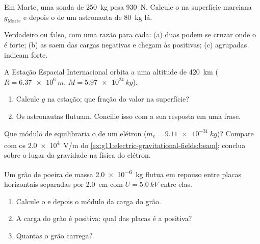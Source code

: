 \begin{exercise}[$\star$]\label{exo:g11:electric-gravitational-fields:4}
Em Marte, uma sonda de \qty{250}{kg} pesa \qty{930}{N}. Calcule o 
na superfície marciana $g_{\text{Marte}}$ e depois o  de um
astronauta de \qty{80}{kg} lá.
\end{exercise}

\begin{exercise}[$\star$]\label{exo:g11:electric-gravitational-fields:5}
Verdadeiro ou falso, com uma razão para cada: (a) duas 
podem se cruzar onde o  é forte; (b) as  saem das
cargas negativas e chegam às positivas; (c)  agrupadas
indicam  forte.
\end{exercise}

\begin{exercise}[$\star\star$]\label{exo:g11:electric-gravitational-fields:6}
A Estação Espacial Internacional orbita a uma altitude de \qty{420}{km}
($R = \qty{6.37e6}{m}$, $M = \qty{5.97e24}{kg}$).
\begin{enumerate}
  \item Calcule $g$ na estação; que fração do valor na superfície?
  \item Os astronautas flutuam. Concilie isso com a sua resposta em uma
        frase.
\end{enumerate}
\end{exercise}

\begin{exercise}[$\star\star$]\label{exo:g11:electric-gravitational-fields:7}
Que módulo de  equilibraria o  de um elétron
($m_e = \qty{9.11e-31}{kg}$)? Compare com os \qty{2.0e4}{V/m} do
\cref{ex:g11:electric-gravitational-fields:beam}; conclua sobre o lugar
da gravidade na física do elétron.
\end{exercise}

\begin{exercise}[$\star\star$]\label{exo:g11:electric-gravitational-fields:8}
Um grão de poeira de massa \qty{2.0e-6}{kg} flutua em repouso entre
placas horizontais separadas por \qty{2.0}{cm} com $U = \qty{5.0}{kV}$
entre elas.
\begin{enumerate}
  \item Calcule o  e depois o módulo da carga do grão.
  \item A carga do grão é positiva: qual das placas é a positiva?
  \item Quantas  o grão carrega?
\end{enumerate}
\end{exercise}

